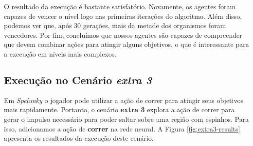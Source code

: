 O resultado da execução é bastante satisfatório. Novamente, os agentes foram
capazes de vencer o nível logo nas primeiras iterações do algoritmo. Além disso,
podemos ver que, após 30 gerações, mais da metade dos organismos foram
vencedores. Por fim, concluímos que nossos agentes são capazes de compreender
que devem combinar ações para atingir alguns objetivos, o que é interessante
para a execução em níveis mais complexos.  

\subsection{\label{section:experiment-extra3}Execução no Cenário \textit{extra
3}}

Em \textit{Spelunky} o jogador pode utilizar a ação de correr para atingir seus
objetivos mais rapidamente. Portanto, o cenário \textbf{extra 3} explora a ação
de correr para gerar o impulso necessário para poder saltar sobre uma região com
espinhos. Para isso, adicionamos a ação de \textbf{correr} na rede neural.  A
Figura \ref{fig:extra3-results} apresenta os resultados da execução deste
cenário.

